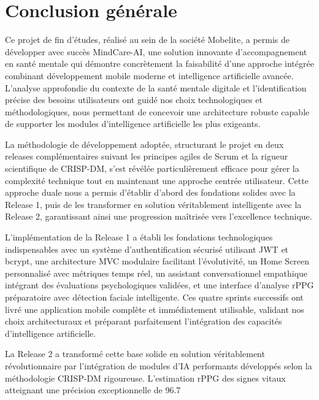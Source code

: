 \chapter*{Conclusion générale}
\thispagestyle{fancy}

Ce projet de fin d'études, réalisé au sein de la société Mobelite, a permis de développer avec succès MindCare-AI, une solution innovante d'accompagnement en santé mentale qui démontre concrètement la faisabilité d'une approche intégrée combinant développement mobile moderne et intelligence artificielle avancée. L'analyse approfondie du contexte de la santé mentale digitale et l'identification précise des besoins utilisateurs ont guidé nos choix technologiques et méthodologiques, nous permettant de concevoir une architecture robuste capable de supporter les modules d'intelligence artificielle les plus exigeants.

La méthodologie de développement adoptée, structurant le projet en deux releases complémentaires suivant les principes agiles de Scrum et la rigueur scientifique de CRISP-DM, s'est révélée particulièrement efficace pour gérer la complexité technique tout en maintenant une approche centrée utilisateur. Cette approche duale nous a permis d'établir d'abord des fondations solides avec la Release 1, puis de les transformer en solution véritablement intelligente avec la Release 2, garantissant ainsi une progression maîtrisée vers l'excellence technique.

L'implémentation de la Release 1 a établi les fondations technologiques indispensables avec un système d'authentification sécurisé utilisant JWT et bcrypt, une architecture MVC modulaire facilitant l'évolutivité, un Home Screen personnalisé avec métriques temps réel, un assistant conversationnel empathique intégrant des évaluations psychologiques validées, et une interface d'analyse rPPG préparatoire avec détection faciale intelligente. Ces quatre sprints successifs ont livré une application mobile complète et immédiatement utilisable, validant nos choix architecturaux et préparant parfaitement l'intégration des capacités d'intelligence artificielle.

La Release 2 a transformé cette base solide en solution véritablement révolutionnaire par l'intégration de modules d'IA performants développés selon la méthodologie CRISP-DM rigoureuse. L'estimation rPPG des signes vitaux atteignant une précision exceptionnelle de 96.7%

